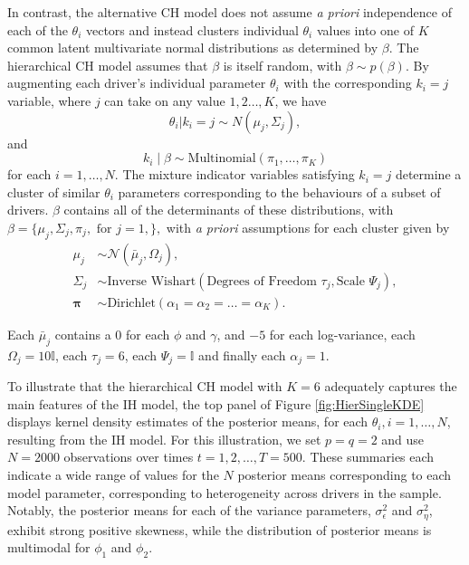 \documentclass[12pt,a4paper]{article}\usepackage[]{graphicx}\usepackage[]{color}
\begin{document}
In contrast, the alternative CH model does not assume \textit{a priori} independence of each of the $\theta_i$ vectors and instead clusters individual $\theta_i$ values into one of $K$ common latent multivariate normal distributions as determined by $\beta.$ The hierarchical CH model assumes that $\beta$ is itself random, with $\beta \sim p(\beta)$. By augmenting each driver's individual parameter $\theta_i$ with the corresponding $k_i=j$ variable, where $j$ can take on any value $1,2 \ldots, K$, we have
\begin{equation}
\label{mixPrior}
\theta_i | k_i = j \sim N(\mu_j, \Sigma_j),
\end{equation}
and
\begin{equation}
k_i \mid \beta \sim \mbox{Multinomial}\left(\pi_1, \dots, \pi_{K}\right)
\end{equation}
for each $i = 1, \dots, N$. The mixture indicator variables satisfying $k_i=j$ determine a cluster of similar $\theta_i$ parameters corresponding to the behaviours of a subset of drivers. $\beta$ contains all of the determinants of these distributions, with $\beta = \{\mu_j,\Sigma_j, \pi_j, \mbox{ for } j=1,\},$ with \textit{a priori} assumptions for each cluster given by  
\begin{align}
\mu_j &\sim \mathcal{N}\left(\bar{\mu}_j, \Omega_j\right), \\
\Sigma_j &\sim \mbox{Inverse Wishart}\left(\mbox{Degrees of Freedom } \tau_j, \mbox{Scale } \Psi_j\right), \\
\boldsymbol{\pi} &\sim \mbox{Dirichlet}\left(\alpha_1 = \alpha_2 = \dots = \alpha_K\right).
\end{align}

Each $\bar{\mu}_j$ contains a $0$ for each $\phi$ and $\gamma$, and $-5$ for each log-variance, each $\Omega_j = 10 \mathbb{I}$, each $\tau_j = 6$, each $\Psi_j = \mathbb{I}$ and finally each $\alpha_j = 1$. 

To illustrate that the hierarchical CH model with $K=6$ adequately captures the main features of the IH model, the top panel of Figure \ref{fig:HierSingleKDE} displays kernel density estimates of the posterior means, for each $\theta_i, i = 1, \dots, N$, resulting from the IH model. For this illustration, we set $p = q = 2$ and use $N=2000$ observations over times $t=1, 2, \ldots, T = 500$. These summaries each indicate a wide range of values for the $N$ posterior means corresponding to each model parameter, corresponding to heterogeneity across drivers in the sample. Notably, the posterior means for each of the variance parameters, $\sigma^2_{\epsilon}$ and $\sigma^2_{\eta}$, exhibit strong positive skewness, while the distribution of posterior means is multimodal for $\phi_1$ and $\phi_2$. 
\end{document}
